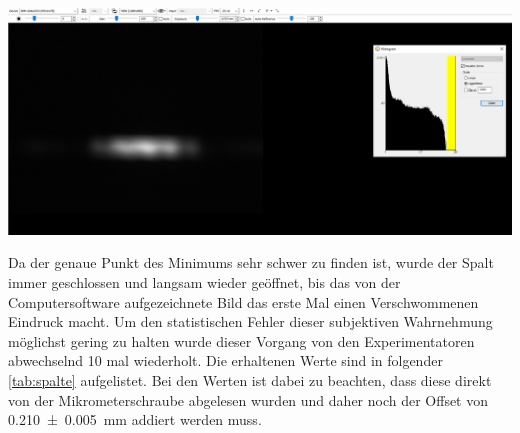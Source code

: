 \documentclass[11pt,ngerman]{scrartcl}
\begin{document}
\begin{center}
	\begin{minipage}[t]{\textwidth}
		\includegraphics[width=\textwidth]{Interfero/Versuch4/mittelkontrastmin}
		\label{fig:v4}
	\end{minipage}
\end{center}

\noindent Da der genaue Punkt des Minimums sehr schwer zu finden ist, wurde der
Spalt immer geschlossen und langsam wieder geöffnet, bis das von der
Computersoftware aufgezeichnete Bild das erste Mal einen Verschwommenen
Eindruck macht. Um den statistischen Fehler dieser subjektiven Wahrnehmung
möglichst gering zu halten wurde dieser Vorgang von den Experimentatoren
abwechselnd 10 mal wiederholt. Die erhaltenen Werte sind in folgender \autoref{tab:spalte}
aufgelistet. Bei den Werten ist dabei zu beachten, dass diese direkt von der
Mikrometerschraube abgelesen wurden und daher noch der Offset von
\SI{0.210(5)}{mm} addiert werden muss.
\end{document}
